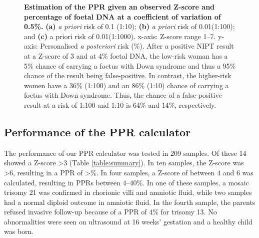 \begin{figure}[!htb]
	{\caption[PPR at different risks]{\textbf{Estimation of the PPR given an observed Z-score and percentage of foetal DNA at a coefficient of variation of 0.5\%.} \textbf{(a)} \textsl{a priori} risk of 0.1 (1:10); \textbf{(b)} \textsl{a priori} risk of 0.01(1:100); and \textbf{(c)} a priori risk of 0.01(1:1000). x-axis: Z-score range 1–7. y-axis: Personalised \textsl{a posteriori} risk (\%). After a positive NIPT result at a Z-score of 3 and at 4\% foetal DNA, the low-risk woman has a 5\% chance of carrying a foetus with Down syndrome and thus a 95\% chance of the result being false-positive. In contrast, the higher-risk women have a 36\% (1:100) and an 86\% (1:10) chance of carrying a foetus with Down syndrome. Thus, the chance of a false-positive result at a risk of 1:100 and 1:10 is 64\% and 14\%, respectively.}
	\label{fig:NIPTRIC_Fig2}}
\end{figure}


\subsection{Performance of the PPR calculator}
The performance of our PPR calculator was tested in 209 samples. 
Of these 14 showed a Z-score \textgreater 3 (Table \ref{table:summary}). In ten samples, the Z-score was \textgreater 6, resulting in a PPR of \textgreater{}\%. In four samples, a Z-score of between 4 and 6 was calculated, resulting in PPRs between 4–40\%. 
In one of these samples, a mosaic trisomy 21 was confirmed in chorionic villi and amniotic fluid, while two samples had a normal diploid outcome in amniotic fluid. 
In the fourth sample, the parents refused invasive follow-up because of a PPR of 4\% for trisomy 13. 
No abnormalities were seen on ultrasound at 16 weeks’ gestation and a healthy child was born.

